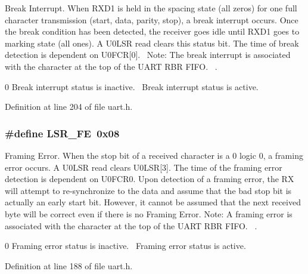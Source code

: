 Break Interrupt. When R\+X\+D1 is held in the spacing state (all zeros) for one full character transmission (start, data, parity, stop), a break interrupt occurs. Once the break condition has been detected, the receiver goes idle until R\+X\+D1 goes to marking state (all ones). A U0\+L\+SR read clears this status bit. The time of break detection is dependent on U0\+F\+CR\mbox{[}0\mbox{]}.~ Note\+: The break interrupt is associated with the character at the top of the U\+A\+RT R\+BR F\+I\+FO.~\newline
. 

0 Break interrupt status is inactive.~ Break interrupt status is active.~\newline


Definition at line 204 of file uart.\+h.

\subsubsection[{\texorpdfstring{L\+S\+R\+\_\+\+FE}{LSR_FE}}]{\setlength{\rightskip}{0pt plus 5cm}\#define L\+S\+R\+\_\+\+FE~0x08}\hypertarget{group___r_e_g_i_s_t_r_o___l_s_r_gae3f9ccc88c615d1257ad400cf27af7eb}{}\label{group___r_e_g_i_s_t_r_o___l_s_r_gae3f9ccc88c615d1257ad400cf27af7eb}


Framing Error. When the stop bit of a received character is a 0 logic 0, a framing error occurs. A U0\+L\+SR read clears U0\+L\+SR\mbox{[}3\mbox{]}. The time of the framing error detection is dependent on U0\+F\+C\+R0. Upon detection of a framing error, the RX will attempt to re-\/synchronize to the data and assume that the bad stop bit is actually an early start bit. However, it cannot be assumed that the next received byte will be correct even if there is no Framing Error. Note\+: A framing error is associated with the character at the top of the U\+A\+RT R\+BR F\+I\+FO.~\newline
. 

0 Framing error status is inactive.~ Framing error status is active.~\newline


Definition at line 188 of file uart.\+h.

